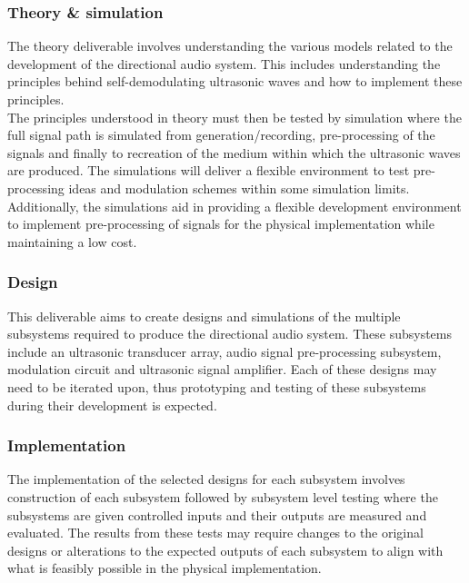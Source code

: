 \subsubsection{Theory \& simulation}
The theory deliverable involves understanding the various models related to the development of the directional audio system. This includes understanding the principles behind self-demodulating ultrasonic waves and how to implement these principles.\\
The principles understood in theory must then be tested by simulation where the full signal path is simulated from generation/recording, pre-processing of the signals and finally to recreation of the medium within which the ultrasonic waves are produced. The simulations will deliver a flexible environment to test pre-processing ideas and modulation schemes within some simulation limits. Additionally, the simulations aid in providing a flexible development environment to implement pre-processing of signals for the physical implementation while maintaining a low cost.
\subsubsection{Design}
This deliverable aims to create designs and simulations of the multiple subsystems required to produce the directional audio system. These subsystems include an ultrasonic transducer array, audio signal pre-processing subsystem, modulation circuit and ultrasonic signal amplifier. Each of these designs may need to be iterated upon, thus prototyping and testing of these subsystems during their development is expected.
\subsubsection{Implementation}
The implementation of the selected designs for each subsystem involves construction of each subsystem followed by subsystem level testing where the subsystems are given controlled inputs and their outputs are measured and evaluated. The results from these tests may require changes to the original designs or alterations to the expected outputs of each subsystem to align with what is feasibly possible in the physical implementation.
\newpage
